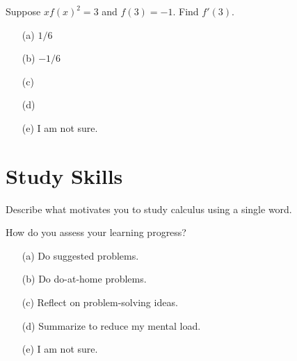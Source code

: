 \documentclass[14pt]{beamer}
\begin{document}
\begin{frame}[t]
  Suppose \(x f(x)^{2} = 3\) and \(f(3) = -1\). Find \(f'(3)\).

  \medskip
  \begin{itemize} \setlength\itemsep{2ex}
    \item[(a)] \(1/6\)
    \item[(b)] \(-1/6\)
    \item[(c)]
    \item[(d)]
    \item[(e)] I am not sure.
  \end{itemize}
\end{frame}

\section{Study Skills}
\begin{frame}
  Describe what motivates you to study calculus using a single word.
\end{frame}

\begin{frame}
  How do you assess your learning progress?

  \medskip
  \begin{itemize} \setlength\itemsep{2ex}
    \item[(a)] Do suggested problems.
    \item[(b)] Do do-at-home problems.
    \item[(c)] Reflect on problem-solving ideas.
    \item[(d)] Summarize to reduce my mental load.
    \item[(e)] I am not sure.
  \end{itemize} 
\end{frame}



%
%
\end{document}

